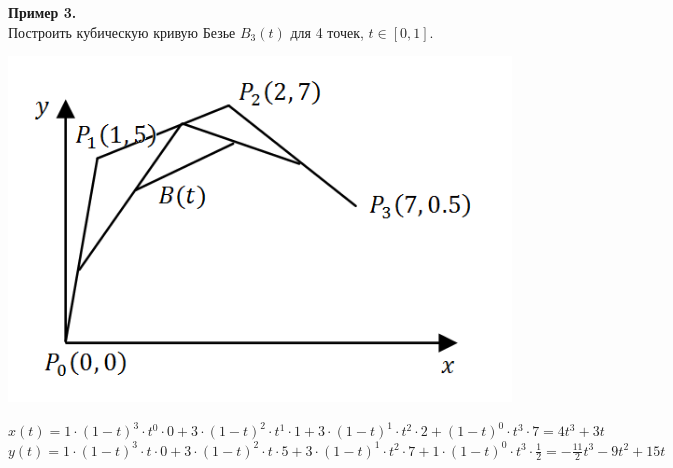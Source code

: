 \documentclass[12pt]{article}
\begin{document}
	\noindent \textbf{Пример 3.}\\
	Построить кубическую кривую Безье $B_3(t)$ для 4 точек, $t\in [0, 1]$.\begin{center}
		\includegraphics[scale=0.7]{l3_9.png}\end{center}
	$x(t) = 1\cdot (1-t)^3\cdot t^0\cdot 0+3\cdot (1-t)^2\cdot t^1\cdot 1+3\cdot (1-t)^1\cdot t^2\cdot 2+(1-t)^0\cdot t^3\cdot 7 = 4t^3+3t$\\
	$y(t) = 1\cdot (1-t)^3\cdot t\cdot 0+3\cdot (1-t)^2\cdot t\cdot 5+3\cdot (1-t)^1\cdot t^2\cdot 7+1\cdot (1-t)^0\cdot t^3\cdot \frac{1}{2} = - \frac{11}{2}t^3-9t^2+15t$\\ \\
\end{document}
